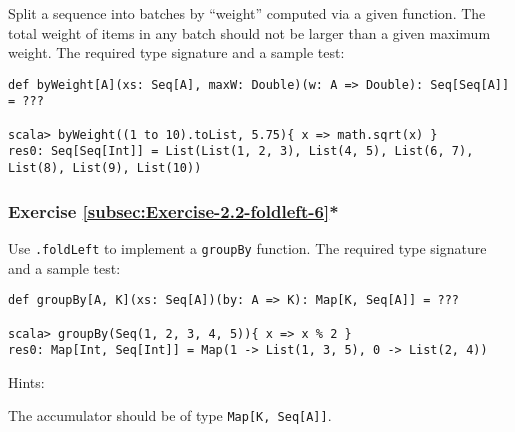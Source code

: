 Split a sequence into batches by ``weight'' computed via a given
function. The total weight of items in any batch should not be larger
than a given maximum weight. The required type signature and a sample
test:
\begin{lstlisting}
def byWeight[A](xs: Seq[A], maxW: Double)(w: A => Double): Seq[Seq[A]] = ???

scala> byWeight((1 to 10).toList, 5.75){ x => math.sqrt(x) }
res0: Seq[Seq[Int]] = List(List(1, 2, 3), List(4, 5), List(6, 7), List(8), List(9), List(10))
\end{lstlisting}
\begin{comment}
Solution:\inputencoding{latin9}
\begin{lstlisting}
def weightBatching[A](xs: Seq[A], maxW: Double)(w: A => Double): Seq[Seq[A]] = {  
  type Acc = (Seq[Seq[A]], Seq[A], Double)
  val init: Acc = ((Seq(), Seq(), 0.0))
  val (result, rem, _) = xs.foldLeft(init) { case ((seq, rem, weight), x) =>
    val wx = w(x)
    if (wx > maxW) (seq ++ Seq(rem, Seq(x)), Seq(), 0.0)
    else {
      val newWeight = weight + wx
      if (newWeight > maxW) (seq ++ Seq(rem), Seq(x), wx)
      else (seq, rem ++ Seq(x), newWeight)
    }
  }
  result ++ Seq(rem)
}
\end{lstlisting}
\inputencoding{utf8}\end{comment}


\subsubsection{Exercise \label{subsec:Exercise-2.2-foldleft-6}\ref{subsec:Exercise-2.2-foldleft-6}{*}}

Use \lstinline!.foldLeft!
to implement a \lstinline!groupBy!
function. The required type signature and a sample test:
\begin{lstlisting}
def groupBy[A, K](xs: Seq[A])(by: A => K): Map[K, Seq[A]] = ???

scala> groupBy(Seq(1, 2, 3, 4, 5)){ x => x % 2 }
res0: Map[Int, Seq[Int]] = Map(1 -> List(1, 3, 5), 0 -> List(2, 4))
\end{lstlisting}
Hints: 

The accumulator should be of type \lstinline!Map[K, Seq[A]]!. 

